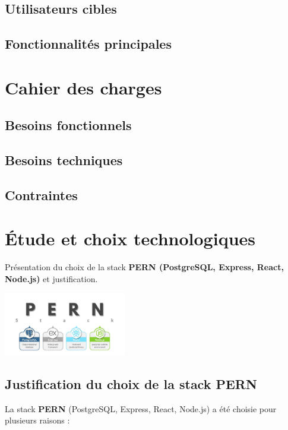 \documentclass[12pt,a4paper]{report}
\begin{document}
\section{Utilisateurs cibles}
\section{Fonctionnalités principales}

\chapter{Cahier des charges}
\section{Besoins fonctionnels}
\section{Besoins techniques}
\section{Contraintes}

\chapter{Étude et choix technologiques}

Présentation du choix de la stack \textbf{PERN (PostgreSQL, Express, React, Node.js)} et justification.  

\begin{center}
    \includegraphics[width=0.4\textwidth]{1_ptqverAyBpdfUDhrs2g_3A.jpg} %
\end{center}

\section*{Justification du choix de la stack PERN}

La stack \textbf{PERN} (PostgreSQL, Express, React, Node.js) a été choisie pour plusieurs raisons :  
\end{document}
